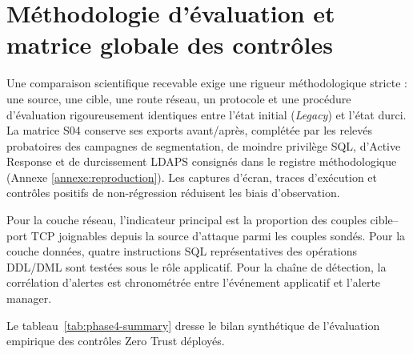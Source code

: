 \documentclass[a4paper,12pt]{report}
\begin{document}
\section{Méthodologie d'évaluation et matrice globale des contrôles}
\label{sec:p4-methodo}
Une comparaison scientifique recevable exige une rigueur méthodologique stricte : une source, une cible, une route réseau, un protocole et une procédure d'évaluation rigoureusement identiques entre l'état initial (\textit{Legacy}) et l'état durci. La matrice S04 conserve ses exports avant/après, complétée par les relevés probatoires des campagnes de segmentation, de moindre privilège SQL, d'Active Response et de durcissement LDAPS consignés dans le registre méthodologique (Annexe \ref{annexe:reproduction}). Les captures d'écran, traces d'exécution et contrôles positifs de non-régression réduisent les biais d'observation.

Pour la couche réseau, l'indicateur principal est la proportion des couples cible--port TCP joignables depuis la source d'attaque parmi les couples sondés. Pour la couche données, quatre instructions SQL représentatives des opérations DDL/DML sont testées sous le rôle applicatif. Pour la chaîne de détection, la corrélation d'alertes est chronométrée entre l'événement applicatif et l'alerte manager.

Le tableau~\ref{tab:phase4-summary} dresse le bilan synthétique de l'évaluation empirique des contrôles Zero Trust déployés.
\end{document}
